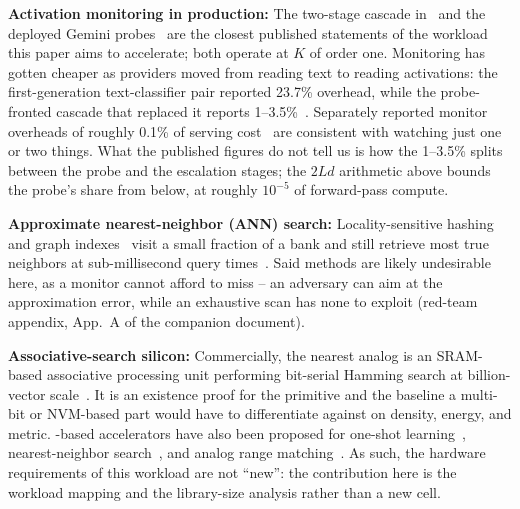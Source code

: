 \textbf{Activation monitoring in production:} The two-stage cascade
in~\cite{ccpp2026,anthropic2026ccblog} and the deployed Gemini
probes~\cite{gemini2026probes} are the closest published statements of
the workload this paper aims to accelerate; both operate at $K$ of
order one.
Monitoring has gotten cheaper as providers moved from reading text to
reading activations: the first-generation text-classifier pair
reported 23.7\% overhead, while the probe-fronted cascade that
replaced it reports 1--3.5\%~\cite{cc2025,ccpp2026}. Separately
reported monitor overheads of roughly 0.1\% of serving
cost~\cite{anthropic2025cheapmonitors} are consistent with watching
just one or two things. What the published figures do not tell us is
how the 1--3.5\% splits between the probe and the escalation stages;
the $2Ld$ arithmetic above bounds the probe's share from below, at
roughly $10^{-5}$ of forward-pass compute.


\textbf{Approximate nearest-neighbor (ANN) search:}
Locality-sensitive
hashing~\cite{indyk1998lsh,charikar2002simhash} and graph
indexes~\cite{malkov2020hnsw} visit a small fraction of a bank and
still retrieve most true neighbors at sub-millisecond query
times~\cite{faisscuvs2025}. Said methods are likely undesirable
here, as a monitor cannot afford to miss -- an adversary can aim at
the approximation error, while an exhaustive scan has none to
exploit (red-team appendix, App.~A of the companion
document).

\textbf{Associative-search silicon:} Commercially, the nearest analog is
an SRAM-based associative processing unit performing bit-serial Hamming
search at billion-vector scale~\cite{gsi2025apu}. It is an existence
proof for the primitive and the baseline a multi-bit or NVM-based part
would have to differentiate against on density, energy, and metric.
\cam-based accelerators have also been proposed for one-shot
learning~\cite{ni2019fetcam}, nearest-neighbor
search~\cite{kazemi2021fefetcam}, and analog range
matching~\cite{li2020acam}. As such, the hardware requirements of
this workload are not ``new'': the contribution here is the workload
mapping and the library-size analysis rather than a new cell.
